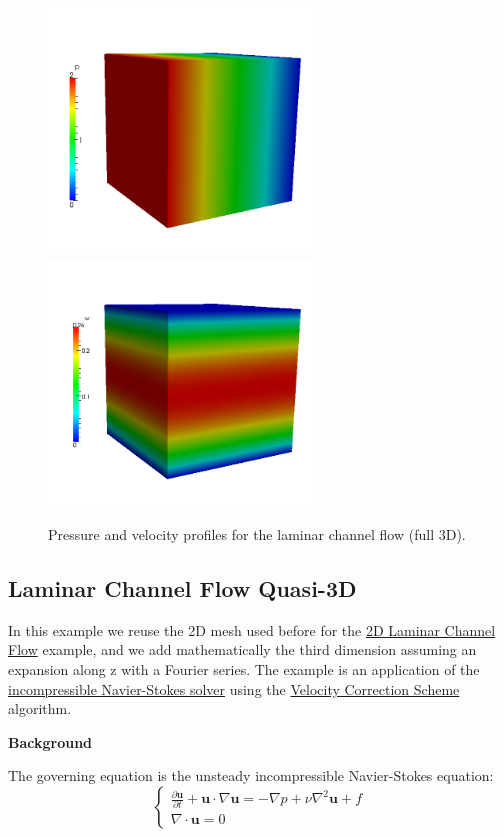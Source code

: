 
\begin{figure}
\begin{center}
\includegraphics[width=7cm]{Figures/CF3DP8PR.png}
\includegraphics[width=7cm]{Figures/CF3DP8.png}
\caption{Pressure and velocity profiles for the laminar channel flow (full 3D).}
\end{center}
\end{figure}


\subsection{Laminar Channel Flow Quasi-3D}
In this example we reuse the 2D mesh used before for the \hyperref[LaminarChannelFlow2D]{2D Laminar Channel Flow} example, and we add mathematically the third dimension assuming an expansion along z with a Fourier series. The example is an application of the \hyperref[IncNSsolver]{incompressible Navier-Stokes solver} using the \hyperref[VCSscheme]{Velocity Correction Scheme} algorithm.

\textbf{Background}

The governing equation is the unsteady incompressible Navier-Stokes equation:
\begin{equation}
\begin{cases}
\frac{\partial \textbf{u}}{\partial t} + \textbf{u} \cdot \nabla \textbf{u} = - \nabla p + \nu \nabla^2 \textbf{u} + f \\
\nabla \cdot \textbf{u} = 0
\end{cases}
\end{equation}

